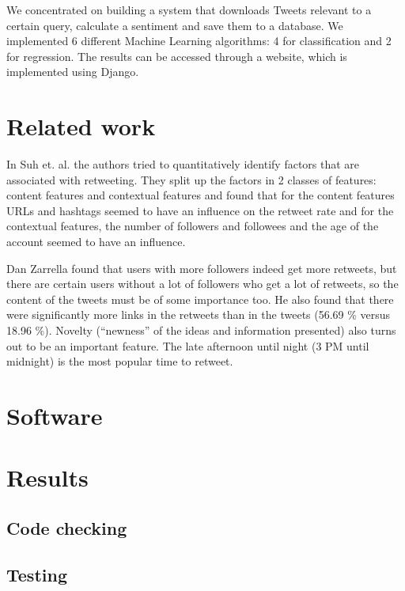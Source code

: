 \documentclass[10pt]{IEEEtran}
\begin{document}
We concentrated on building a system that downloads Tweets relevant to a certain query, calculate a sentiment and save them to a database. We implemented 6 different Machine Learning algorithms: 4 for classification and 2 for regression. The results can be accessed through a website, which is implemented using Django.

\section{Related work}

In Suh et. al. \cite{want_to_be_retweeted} the authors tried to quantitatively identify factors that are associated with retweeting. They split up the factors in 2 classes of features: content features and contextual features and found that for the content features URLs and hashtags seemed to have an influence on the retweet rate and for the contextual features, the number of followers and followees and the age of the account seemed to have an influence. 

Dan Zarrella \cite{science_of_retweets} found that users with more followers indeed get more retweets, but there are certain users without a lot of followers who get a lot of retweets, so the content of the tweets must be of some importance too. He also found that there were significantly more links in the retweets than in the tweets (56.69 \% versus 18.96 \%). Novelty (``newness'' of the ideas and information presented) also turns out to be an important feature. The late afternoon until night (3 PM until midnight) is the most popular time to retweet. 



\section{Software}


\section{Results}


\subsection{Code checking}


\subsection{Testing}
\end{document}

